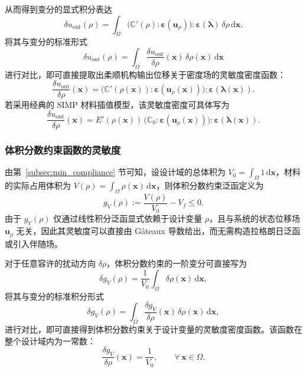 从而得到变分的显式积分表达
\[
\delta u_{\mathrm{out}}(\rho) = \int_{\Omega} \big(\mathbb{C}'(\rho):\boldsymbol{\varepsilon}(\boldsymbol{u}_\rho)\big) :\boldsymbol{\varepsilon}(\boldsymbol{\lambda})\, \delta\rho\,\mathrm{d}\boldsymbol{x}.
\]
将其与变分的标准形式
\[
\delta u_{\mathrm{out}}(\rho) = \int_{\Omega}\frac{\delta u_{\mathrm{out}}}{\delta\rho}(\boldsymbol{x})\, \delta\rho(\boldsymbol{x})\,\mathrm{d}\boldsymbol{x}
\]
进行对比，即可直接提取出柔顺机构输出位移关于密度场的灵敏度密度函数：
\begin{equation} \label{eq:ch2_mechanism_sensitivity_general}
	\frac{\delta u_{\mathrm{out}}}{\delta\rho}(\boldsymbol{x}) = \big(\mathbb{C}'(\rho(\boldsymbol{x})) : \boldsymbol{\varepsilon}(\boldsymbol{u}_\rho(\boldsymbol{x}))\big) : \boldsymbol{\varepsilon}(\boldsymbol{\lambda}(\boldsymbol{x})).
\end{equation}
若采用经典的 SIMP 材料插值模型，该灵敏度密度可具体写为
\[
\frac{\delta u_{\mathrm{out}}}{\delta\rho}(\boldsymbol{x}) = E'(\rho(\boldsymbol{x}))\, \big(\mathbb{C}_0:\boldsymbol{\varepsilon}(\boldsymbol{u}_\rho(\boldsymbol{x}))\big) : \boldsymbol{\varepsilon}(\boldsymbol{\lambda}(\boldsymbol{x})).
\]


\subsubsection*{体积分数约束函数的灵敏度}

由第~\ref{subsec:min_compliance} 节可知，设设计域的总体积为 $V_0 = \int_{\Omega} 1\,\mathrm{d}\boldsymbol{x}$，材料的实际占用体积为 $V(\rho) = \int_{\Omega}\rho(\boldsymbol{x})\,\mathrm{d}\boldsymbol{x}$，则体积分数约束泛函定义为	
\[
g_V(\rho) := \frac{V(\rho)}{V_0} - V_f \le 0.
\]
由于 $g_V(\rho)$ 仅通过线性积分泛函显式依赖于设计变量 $\rho$，且与系统的状态位移场 $\boldsymbol{u}_\rho$ 无关，因此其灵敏度可以直接由 Gâteaux 导数给出，而无需构造拉格朗日泛函或引入伴随场。

对于任意容许的扰动方向 $\delta\rho$，体积分数约束的一阶变分可直接写为
\[
\delta g_V(\rho) = \frac{1}{V_0}\int_{\Omega}\delta\rho(\boldsymbol{x})\,\mathrm{d}\boldsymbol{x},
\]
将其与变分的标准积分形式
\[
\delta g_V(\rho) = \int_{\Omega}\frac{\delta g_V}{\delta\rho}(\boldsymbol{x})\,\delta\rho(\boldsymbol{x})\,\mathrm{d}\boldsymbol{x},
\]
进行对比，即可直接得到体积分数约束关于设计变量的灵敏度密度函数。该函数在整个设计域内为一常数：
\begin{equation} \label{eq:ch2_volume_sensitivity}
	\frac{\delta g_V}{\delta\rho}(\boldsymbol{x}) = \frac{1}{V_0}, \qquad \forall\,\boldsymbol{x}\in\Omega.
\end{equation}


